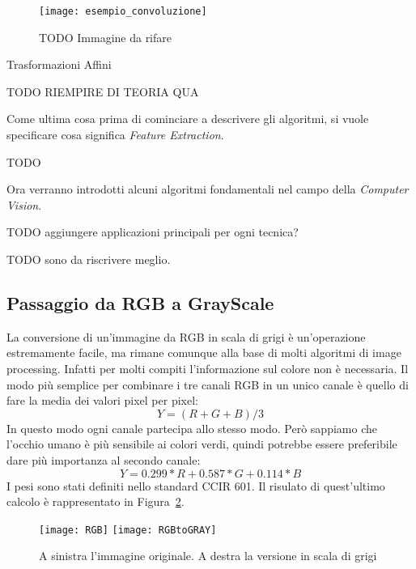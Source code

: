 
\begin{figure}[ht]
  \texttt{[image: esempio\_convoluzione]}
  \label{fig:conv_example}
  \caption{TODO Immagine da rifare}
\end{figure}

Trasformazioni Affini 

TODO RIEMPIRE DI TEORIA QUA


Come ultima cosa prima di cominciare a descrivere gli algoritmi, si vuole specificare cosa significa \textit{Feature Extraction}.

TODO


\clearpage
Ora verranno introdotti alcuni algoritmi fondamentali nel campo della \textit{Computer Vision}.

TODO aggiungere applicazioni principali per ogni tecnica?

TODO sono da riscrivere meglio.


\subsection {Passaggio da RGB a GrayScale}
La conversione di un'immagine da RGB in scala di grigi è un'operazione estremamente facile, ma rimane comunque alla base di molti algoritmi di image processing.
Infatti per molti compiti l'informazione sul colore non è necessaria.
Il modo più semplice per combinare i tre canali RGB in un unico canale è quello di fare la media dei valori pixel per pixel:
\begin{equation}
  Y = (R + G + B)/3
\end{equation}
\label{eq:rgb2gray_avg}
In questo modo ogni canale partecipa allo stesso modo.
Però sappiamo che l'occhio umano è più sensibile ai colori verdi, quindi potrebbe essere preferibile dare più importanza al secondo canale:
\begin{equation}
  Y = 0.299*R + 0.587*G + 0.114*B
\end{equation}
\label{eq:rgb2gray}
I pesi sono stati definiti nello standard CCIR 601.
Il risulato di quest'ultimo calcolo è rappresentato in Figura~\ref{fig:rgb2gray_example}.

\begin{figure}[ht]
  \begin{center}
    \texttt{[image: RGB]}
    \texttt{[image: RGBtoGRAY]}
    \label{fig:rgb2gray_example}
    \caption{A sinistra l'immagine originale. A destra la versione in scala di grigi}
  \end{center}
\end{figure}



